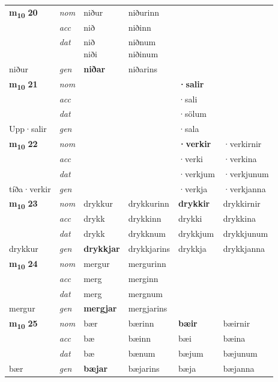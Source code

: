 \begin{longtable}[l]{X>{\footnotesize\itshape}XXXXX}
\multirow{3}{*}{{{\textbf{m{\textsubscript{10}}} \Large{\textbf{20}}}}} & nom & niður & niðurinn & \textbf{} &  \\*
 & acc & nið & niðinn &  &  \\*
 & dat & \specialcell{nið\\ niði} & \specialcell{niðnum\\ niðinum} &  &  \\*
 {\footnotesize{niður}} & gen & \textbf{niðar} & niðarins &  &  \\
\midrule

\multirow{3}{*}{{{\textbf{m{\textsubscript{10}}} \Large{\textbf{21}}}}} & nom &  &  & \textbf{·salir} &  \\*
 & acc &  &  & ·sali &  \\*
 & dat &  &  & ·sölum &  \\*
 {\footnotesize{Upp\allowbreak ·salir}} & gen & \textbf{} &  & ·sala &  \\
\midrule

\multirow{3}{*}{{{\textbf{m{\textsubscript{10}}} \Large{\textbf{22}}}}} & nom &  &  & \textbf{·verkir} & ·verkirnir \\*
 & acc &  &  & ·verki & ·verkina \\*
 & dat &  &  & ·verkjum & ·verkjunum \\*
 {\footnotesize{tíða\allowbreak ·verkir}} & gen & \textbf{} &  & ·verkja & ·verkjanna \\
\midrule

\multirow{3}{*}{{{\textbf{m{\textsubscript{10}}} \Large{\textbf{23}}}}} & nom & drykkur & drykkurinn & \textbf{drykkir} & drykkirnir \\*
 & acc & drykk & drykkinn & drykki & drykkina \\*
 & dat & drykk & drykknum & drykkjum & drykkjunum \\*
 {\footnotesize{drykkur}} & gen & \textbf{drykkjar} & drykkjarins & drykkja & drykkjanna \\
\midrule

\multirow{3}{*}{{{\textbf{m{\textsubscript{10}}} \Large{\textbf{24}}}}} & nom & mergur & mergurinn & \textbf{} &  \\*
 & acc & merg & merginn &  &  \\*
 & dat & merg & mergnum &  &  \\*
 {\footnotesize{mergur}} & gen & \textbf{mergjar} & mergjarins &  &  \\
\midrule

\multirow{3}{*}{{{\textbf{m{\textsubscript{10}}} \Large{\textbf{25}}}}} & nom & bær & bærinn & \textbf{bæir} & bæirnir \\*
 & acc & bæ & bæinn & bæi & bæina \\*
 & dat & bæ & bænum & bæjum & bæjunum \\*
 {\footnotesize{bær}} & gen & \textbf{bæjar} & bæjarins & bæja & bæjanna \\
\midrule


\end{longtable}
